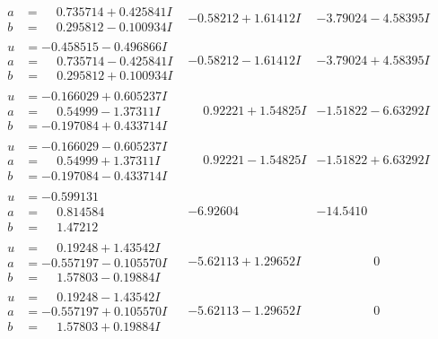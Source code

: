 \documentclass[1p]{elsarticle_modified}
\theoremstyle{definition}
\begin{document}
$$\begin{array}{c|c|c}
\begin{aligned}
a &= \phantom{-}0.735714 + 0.425841 I \\
b &= \phantom{-}0.295812 - 0.100934 I\end{aligned}
 & -0.58212 + 1.61412 I & -3.79024 - 4.58395 I \\ \hline\begin{aligned}
u &= -0.458515 - 0.496866 I \\
a &= \phantom{-}0.735714 - 0.425841 I \\
b &= \phantom{-}0.295812 + 0.100934 I\end{aligned}
 & -0.58212 - 1.61412 I & -3.79024 + 4.58395 I \\ \hline\begin{aligned}
u &= -0.166029 + 0.605237 I \\
a &= \phantom{-}0.54999 - 1.37311 I \\
b &= -0.197084 + 0.433714 I\end{aligned}
 & \phantom{-}0.92221 + 1.54825 I & -1.51822 - 6.63292 I \\ \hline\begin{aligned}
u &= -0.166029 - 0.605237 I \\
a &= \phantom{-}0.54999 + 1.37311 I \\
b &= -0.197084 - 0.433714 I\end{aligned}
 & \phantom{-}0.92221 - 1.54825 I & -1.51822 + 6.63292 I \\ \hline\begin{aligned}
u &= -0.599131\phantom{ +0.000000I} \\
a &= \phantom{-}0.814584\phantom{ +0.000000I} \\
b &= \phantom{-}1.47212\phantom{ +0.000000I}\end{aligned}
 & -6.92604\phantom{ +0.000000I} & -14.5410\phantom{ +0.000000I} \\ \hline\begin{aligned}
u &= \phantom{-}0.19248 + 1.43542 I \\
a &= -0.557197 - 0.105570 I \\
b &= \phantom{-}1.57803 - 0.19884 I\end{aligned}
 & -5.62113 + 1.29652 I & \phantom{-0.000000 } 0 \\ \hline\begin{aligned}
u &= \phantom{-}0.19248 - 1.43542 I \\
a &= -0.557197 + 0.105570 I \\
b &= \phantom{-}1.57803 + 0.19884 I\end{aligned}
 & -5.62113 - 1.29652 I & \phantom{-0.000000 } 0 \\ \hline\begin{aligned}

\end{aligned}
\end{array}$$
\end{document}
